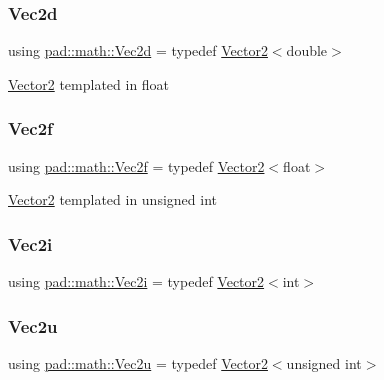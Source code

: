 \subsubsection{\texorpdfstring{Vec2d}{Vec2d}}
{\footnotesize\ttfamily using \mbox{\hyperlink{namespacepad_1_1math_abd85fd80e659deccc912cdeb3ac642c6}{pad\+::math\+::\+Vec2d}} = typedef \mbox{\hyperlink{structpad_1_1math_1_1_vector2}{Vector2}}$<$double$>$}

\mbox{\hyperlink{structpad_1_1math_1_1_vector2}{Vector2}} templated in float \mbox{\label{namespacepad_1_1math_ab0803f135ddbb0a7bd40161ac33fe108}} 
\subsubsection{\texorpdfstring{Vec2f}{Vec2f}}
{\footnotesize\ttfamily using \mbox{\hyperlink{namespacepad_1_1math_ab0803f135ddbb0a7bd40161ac33fe108}{pad\+::math\+::\+Vec2f}} = typedef \mbox{\hyperlink{structpad_1_1math_1_1_vector2}{Vector2}}$<$float$>$}

\mbox{\hyperlink{structpad_1_1math_1_1_vector2}{Vector2}} templated in unsigned int \mbox{\label{namespacepad_1_1math_a808a631a6bccd994f9589d7fb86bad41}} 
\subsubsection{\texorpdfstring{Vec2i}{Vec2i}}
{\footnotesize\ttfamily using \mbox{\hyperlink{namespacepad_1_1math_a808a631a6bccd994f9589d7fb86bad41}{pad\+::math\+::\+Vec2i}} = typedef \mbox{\hyperlink{structpad_1_1math_1_1_vector2}{Vector2}}$<$int$>$}

\mbox{\label{namespacepad_1_1math_ab13dd37cee5ea5816af695f75c85f6c3}} 
\subsubsection{\texorpdfstring{Vec2u}{Vec2u}}
{\footnotesize\ttfamily using \mbox{\hyperlink{namespacepad_1_1math_ab13dd37cee5ea5816af695f75c85f6c3}{pad\+::math\+::\+Vec2u}} = typedef \mbox{\hyperlink{structpad_1_1math_1_1_vector2}{Vector2}}$<$unsigned int$>$}

